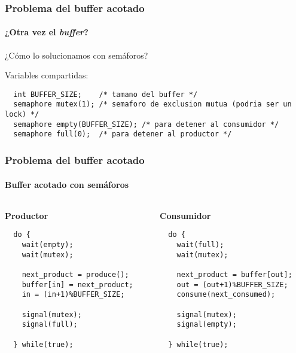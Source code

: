\documentclass[letter]{beamer}
\begin{document}
\begin{frame}[fragile]
  \frametitle{Problema del buffer acotado}
  \framesubtitle{¿Otra vez el {\em buffer}?}

  ¿Cómo lo solucionamos con semáforos?
  
  Variables compartidas:
\begin{verbatim}
  int BUFFER_SIZE;    /* tamano del buffer */
  semaphore mutex(1); /* semaforo de exclusion mutua (podria ser un lock) */
  semaphore empty(BUFFER_SIZE); /* para detener al consumidor */
  semaphore full(0);  /* para detener al productor */
\end{verbatim}


\end{frame}

\begin{frame}[fragile]
  \frametitle{Problema del buffer acotado}
  \framesubtitle{Buffer acotado con semáforos}


  \begin{columns}[c]
    \begin{column}[T]{6cm}
      \begin{center}
        {\bf Productor}
      \end{center}
\begin{verbatim}
  do {
    wait(empty);
    wait(mutex);

    next_product = produce();
    buffer[in] = next_product;
    in = (in+1)%BUFFER_SIZE;
    
    signal(mutex);
    signal(full);

  } while(true);
\end{verbatim}
    \end{column}
    
    \begin{column}[T]{6cm}
      \begin{center}
        {\bf Consumidor}
      \end{center}
\begin{verbatim}
  do {
    wait(full);
    wait(mutex);

    next_product = buffer[out];
    out = (out+1)%BUFFER_SIZE;
    consume(next_consumed);
    
    signal(mutex);
    signal(empty);

  } while(true);
\end{verbatim}
    \end{column}
  \end{columns}



\end{frame}
\end{document}
